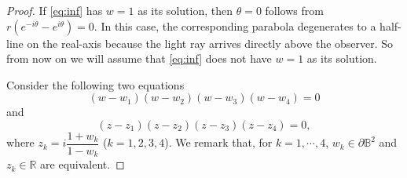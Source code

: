 \documentclass[10pt,a4paper]{amsart}
\begin{document}
\noindent \begin{proof}
If \eqref{eq:inf} has $ w=1 $ as its solution, 
then $ \theta=0 $ follows from $ r(e^{-i\theta}-e^{i\theta})=0 $.
In this case, the corresponding parabola degenerates to a 
half-line on the real-axis because the light ray arrives 
directly above the observer.
So from now on we will assume that \eqref{eq:inf}
does not have $w=1$ as its solution.

Consider the following two equations
\begin{equation}\label{eq:D}
  (w-w_1)(w-w_2)(w-w_3)(w-w_4)=0
\end{equation}
and
\begin{equation}\label{eq:R}
  (z-z_1)(z-z_2)(z-z_3)(z-z_4)=0,
\end{equation}
where $ z_k=i\dfrac{1+w_k}{1-w_k} $ ($ k=1,2,3,4 $).
We remark that, for $ k=1,\cdots,4 $,  $ w_k\in\partial \mathbb{B}^2 $
and $ z_k\in\mathbb{R} $ are equivalent.


\end{proof}
\end{document}
